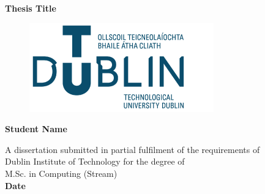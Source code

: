 \documentclass[oneside,12pt]{book}
\begin{document}
\begin{titlepage}
    \begin{center}
        \vspace*{1.5cm}
        
        \Huge
        \textbf{Thesis Title}
        
        \vspace{0.5cm}
        \begin{figure}[H]
    	\centering
    	\hspace{7mm} \includegraphics[scale=0.5]{TU_logo}
        \end{figure}
        
        \vspace{1.5cm}
        
        \textbf{Student Name}
        
        \vfill
       \large
        A dissertation submitted in partial fulfilment of the requirements of\\
	Dublin Institute of Technology for the degree of\\
	M.Sc. in Computing (Stream)\\
       \vspace{0.5cm}
        \textbf{Date}
        \vspace{0.8cm}
 
    \end{center}
\end{titlepage}

\pagestyle{fancy}
\fancyhf{}
\fancyfoot[CE,CO]{\thepage}
\renewcommand{\headrulewidth}{0pt}




\end{document}
